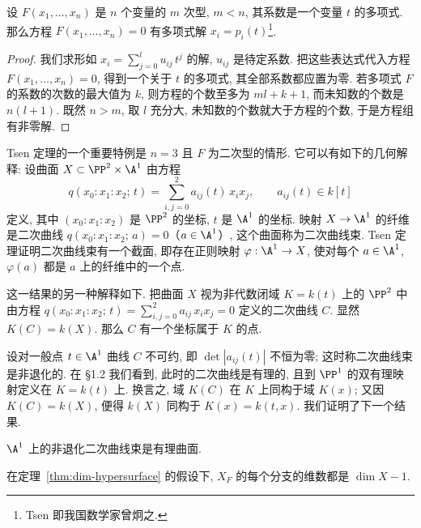 \begin{corollary}[Tsen 定理]\label{cor:tsen}
	设 $F(x_1, \ldots, x_n)$ 是 $n$ 个变量的 $m$ 次型, $m < n$, 其系数是一个变量 $t$ 的多项式. 那么方程 $F(x_1, \ldots, x_n) = 0$ 有多项式解 $x_i = p_i(t)$\footnote{Tsen 即我国数学家曾炯之.}.
\end{corollary}

\begin{proof}
	我们求形如 $x_i = \sum_{j=0}^{l} u_{ij}\, t^j$ 的解, $u_{ij}$ 是待定系数. 把这些表达式代入方程 $F(x_1, \ldots, x_n) = 0$, 得到一个关于 $t$ 的多项式, 其全部系数都应置为零. 若多项式 $F$ 的系数的次数的最大值为 $k$, 则方程的个数至多为 $ml + k + 1$, 而未知数的个数是 $n(l+1)$. 既然 $n > m$, 取 $l$ 充分大, 未知数的个数就大于方程的个数, 于是方程组有非零解.
\end{proof}

\begin{example}[二次曲线束]\label{exam:conic-bundle}
	Tsen 定理的一个重要特例是 $n = 3$ 且 $F$ 为二次型的情形. 它可以有如下的几何解释: 设曲面 $X \subset \PP^2 \times \A^1$ 由方程
	\[
		q(x_0 : x_1 : x_2;\, t) = \sum_{i,j=0}^{2} a_{ij}(t)\, x_i x_j, \qquad a_{ij}(t) \in k[t]
	\]
	定义, 其中 $(x_0 : x_1 : x_2)$ 是 $\PP^2$ 的坐标, $t$ 是 $\A^1$ 的坐标. 映射 $X \to \A^1$ 的纤维是二次曲线 $q(x_0 : x_1 : x_2;\, a) = 0$（$a \in \A^1$）, 这个曲面称为二次曲线束. Tsen 定理证明二次曲线束有一个截面, 即存在正则映射 $\varphi: \A^1 \to X$, 使对每个 $a \in \A^1$, $\varphi(a)$ 都是 $a$ 上的纤维中的一个点.

	这一结果的另一种解释如下. 把曲面 $X$ 视为非代数闭域 $K = k(t)$ 上的 $\PP^2$ 中由方程 $q(x_0 : x_1 : x_2;\, t) = \sum_{i,j=0}^{2} a_{ij}\, x_i x_j = 0$ 定义的二次曲线 $C$. 显然 $K(C) = k(X)$. 那么 $C$ 有一个坐标属于 $K$ 的点.

	设对一般点 $t \in \A^1$ 曲线 $C$ 不可约, 即 $\det|a_{ij}(t)|$ 不恒为零; 这时称二次曲线束是非退化的. 在 §1.2 我们看到, 此时的二次曲线是有理的, 且到 $\PP^1$ 的双有理映射定义在 $K = k(t)$ 上. 换言之, 域 $K(C)$ 在 $K$ 上同构于域 $K(x)$; 又因 $K(C) = k(X)$, 便得 $k(X)$ 同构于 $K(x) = k(t, x)$. 我们证明了下一个结果.
\end{example}

\begin{corollary}\label{cor:pencil-rational}
	$\A^1$ 上的非退化二次曲线束是有理曲面.
\end{corollary}

\begin{theorem}\label{thm:all-components}
	在定理~\ref{thm:dim-hypersurface} 的假设下, $X_F$ 的每个分支的维数都是 $\dim X - 1$.
\end{theorem}

